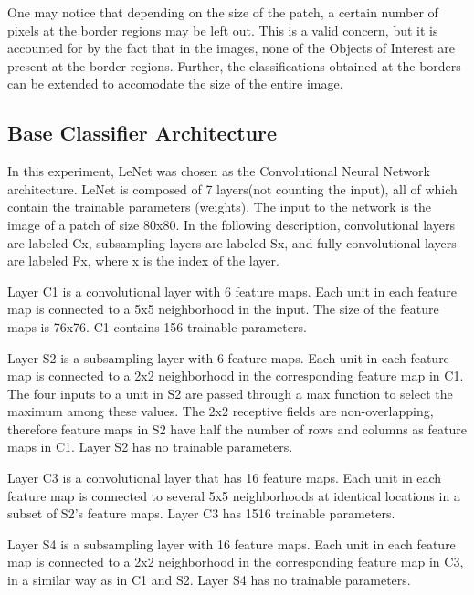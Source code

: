 \documentclass{nitk}
\begin{document}
One may notice that depending on the size of the patch, a certain number of pixels at the border regions may be left out. This is a valid concern, but it is accounted for by the fact that in the images, none of the Objects of Interest are present at the border regions. Further, the classifications obtained at the borders can be extended to accomodate the size of the entire image. 

\subsection{Base Classifier Architecture}    
    In this experiment, LeNet was chosen as the Convolutional Neural Network architecture. LeNet is composed of 7 layers(not counting the input), all of which contain the trainable parameters (weights). The input to the network is the image of a patch of size 80x80. In the following description, convolutional layers are labeled Cx, subsampling layers are labeled Sx, and fully-convolutional layers are labeled Fx, where x is the index of the layer. \\ \par

Layer C1 is a convolutional layer with 6 feature maps. Each unit in each feature map is connected to a 5x5 neighborhood in the input. The size of the feature maps is 76x76. C1 contains 156 trainable parameters.  \\ \par

Layer S2 is a subsampling layer with 6 feature maps. Each unit in each feature map is connected to a 2x2 neighborhood in the corresponding feature map in C1. The four inputs to a unit in S2 are passed through a max function to select the maximum among these values. The 2x2 receptive fields are non-overlapping, therefore feature maps in S2 have half the number of rows and columns as feature maps in C1. Layer S2 has no trainable parameters. \\ \par

Layer C3 is a convolutional layer that has 16 feature maps. Each unit in each feature map is connected to several 5x5 neighborhoods at identical locations in a subset of S2's feature maps. Layer C3 has 1516 trainable parameters. \\ \par

Layer S4 is a subsampling layer with 16 feature maps. Each unit in each feature map is connected to a 2x2 neighborhood in the corresponding feature map in C3, in a similar way as in C1 and S2. Layer S4 has no trainable parameters. \\ \par
\end{document}

